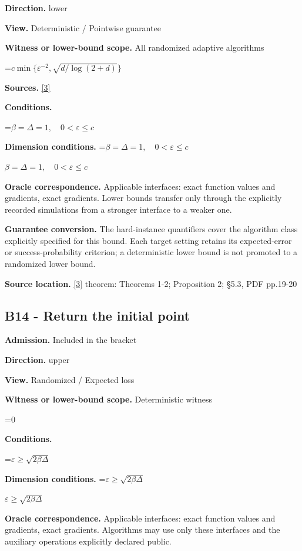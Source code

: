 \documentclass[10pt,a4paper]{article}
\newcommand{\AtlasMath}[1]{\par\begingroup\centering\setbox0=\hbox{$\displaystyle #1$}\ifdim\wd0>1.4\linewidth\typeout{ATLAS WIDE FORMULA: \the\wd0}\fi\ifdim\wd0>\linewidth\resizebox{\linewidth}{!}{\box0}\else\box0\fi\par\endgroup}
\newcommand{\AtlasInlineMath}[1]{\begingroup\setbox0=\hbox{$#1$}\ifdim\wd0>.4\linewidth\endgroup\AtlasMath{#1}\else\endgroup$#1$\fi}
\begin{document}
\textbf{Direction.} lower

\textbf{View.} Deterministic / Pointwise guarantee

\textbf{Witness or lower-bound scope.} All randomized adaptive algorithms

\AtlasMath{c\min\{\varepsilon^{-2},\sqrt{d/\log(2+d)}\}}
\textbf{Sources.} \href{https://arxiv.org/pdf/1710.11606}{[3]}

\textbf{Conditions.} 


\AtlasMath{\beta=\Delta=1,\quad0<\varepsilon\le c}




\textbf{Dimension conditions.} \AtlasInlineMath{\beta=\Delta=1,\quad0<\varepsilon\le c}

\textbf{Oracle correspondence.} Applicable interfaces: exact function values and gradients, exact gradients. Lower bounds transfer only through the explicitly recorded simulations from a stronger interface to a weaker one.

\textbf{Guarantee conversion.} The hard-instance quantifiers cover the algorithm class explicitly specified for this bound. Each target setting retains its expected-error or success-probability criterion; a deterministic lower bound is not promoted to a randomized lower bound.

\textbf{Source location.} \href{https://arxiv.org/pdf/1710.11606}{[3]} theorem: Theorems 1-2; Proposition 2; §5.3, PDF pp.19-20

\subsection{B14 - Return the initial point}
\textbf{Admission.} Included in the bracket

\textbf{Direction.} upper

\textbf{View.} Randomized / Expected loss

\textbf{Witness or lower-bound scope.} Deterministic witness

\AtlasMath{0}
\textbf{Conditions.} 


\AtlasMath{\varepsilon\ge\sqrt{2\beta\Delta}}




\textbf{Dimension conditions.} \AtlasInlineMath{\varepsilon\ge\sqrt{2\beta\Delta}}

\textbf{Oracle correspondence.} Applicable interfaces: exact function values and gradients, exact gradients. Algorithms may use only these interfaces and the auxiliary operations explicitly declared public.
\end{document}
